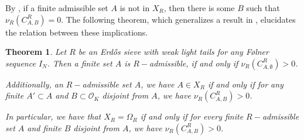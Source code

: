 \documentclass[a4paper,11pt,reqno]{amsart}
\theoremstyle{plain}
\newtheorem{theorem}{Theorem}[section]
\theoremstyle{remark}
\newcommand{\co}{\mathcal{O}}
\begin{document}
		
			
			
			By , if a finite admissible set $A$ is not in $X_R$, then there is some $B$ such that $\nu_R(C^R_{A,B}) = 0$. The following theorem, which generalizes a result in  \cite{Bartnicka}, elucidates the relation between these implications.
		
			
			\begin{theorem}
				\label{thm: Finite Admissible sets have positive density}
				Let $R$ be an Erdős sieve with weak light tails for any Følner sequence $I_N$. Then a finite set $A$ is $R-$admissible, if and only if $\nu_R(C^R_{A,\emptyset}) > 0$.
				
				Additionally, an $R-$admissible set $A$, we have $A\in X_R$  if and only if for any finite $A' \subset A$ and $B\subset \co_K$ disjoint from $A$, we have $\nu_R(C^R_{A,B}) > 0$. 
				
				In particular, we have that $X_R = \Omega_{R}$ if and only if for every finite $R-$admissible set $A$ and finite $B$ disjoint from $A$, we have $\nu_R(C^R_{A,B}) > 0$.
			\end{theorem}
			
\end{document}
